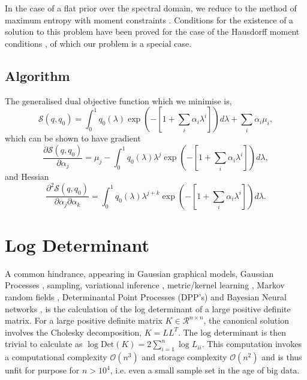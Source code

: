 \documentclass[letterpaper]{article} %
\begin{document}
In the case of a flat prior over the spectral domain, we reduce to the method of maximum entropy with moment constraints \cite{jaynes1982rationale,inftheoryjaynes}. Conditions for the existence of a solution to this problem have been proved for the case of the Hausdorff moment conditions \cite{mead1984maximum}, of which our problem is a special case. 

\subsection{Algorithm}
\label{algorithm}
The generalised dual objective function which we minimise is,
\begin{equation}
\mathcal{S}(q,q_{0}) = \int_{0}^{1}q_{0}(\lambda)\exp(-[1+\sum_{i}\alpha_{i}\lambda^{i}])d\lambda + \sum_{i}\alpha_{i}\mu_{i},
\end{equation}
which can be shown to have gradient
\begin{equation}
\frac{\partial \mathcal{S}(q,q_{0})}{\partial \alpha_{j}}= \mu_{j}-\int_{0}^{1}q_{0}(\lambda)\lambda^{j}\exp(-[1+\sum_{i}\alpha_{i}\lambda^{i}])d\lambda,
\end{equation}
and Hessian
\begin{equation}
\frac{\partial^{2} \mathcal{S}(q,q_{0})}{\partial \alpha_{j}\partial\alpha_{k}}= \int_{0}^{1}q_{0}(\lambda)\lambda^{j+k}\exp(-[1+\sum_{i}\alpha_{i}\lambda^{i}])d\lambda.
\end{equation}
\section{Log Determinant}
A common hindrance, appearing in Gaussian graphical models, Gaussian Processes \cite{rue2005gaussian,rasmussen2006gaussian}, sampling, variational inference \cite{mackay2003information}, metric/kernel learning \cite{davis2007information,van2009minimum}, Markov random fields \cite{wainwright2006log}, Determinantal Point Processes (DPP's) and Bayesian Neural networks \cite{mackay1992bayesian}, is the calculation of the log determinant of a large positive definite matrix. For a large positive definite matrix $K \in  \mathcal{R}^{n\times n}$, the canonical solution involves the Cholesky decomposition, $K = LL^{T}$. The log determinant is then trivial to calculate as $\log \mathrm{Det}(K) = 2\sum_{i=1}^{n}\log L_{ii}$. This computation invokes a computational complexity $\mathcal{O}(n^{3})$ and storage complexity $\mathcal{O}(n^{2})$ and is thus unfit for purpose for $n>10^{4}$, i.e. even a small sample set in the age of big data. 
\end{document}
